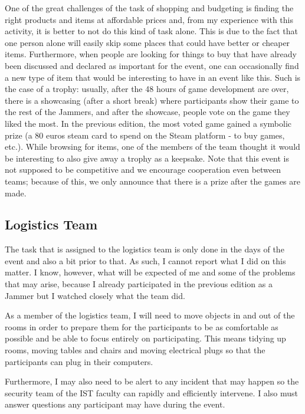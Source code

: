 \documentclass[a4paper,12pt,journal,twoside,compsoc]{PPIEEEtran}
\begin{document}
One of the great challenges of the task of shopping and budgeting is finding the right products and items at affordable prices and, from my experience with this activity, it is better to not do this kind of task alone. This is due to the fact that one person alone will easily skip some places that could have better or cheaper items. Furthermore, when people are looking for things to buy that have already been discussed and declared as important for the event, one can occasionally find a new type of item that would be interesting to have in an event like this. Such is the case of a trophy: usually, after the 48 hours of game development are over, there is a showcasing (after a short break) where participants show their game to the rest of the Jammers, and after the showcase, people vote on the game they liked the most. In the previous edition, the most voted game gained a symbolic prize (a 80 euros steam card to spend on the Steam platform - to buy games, etc.). While browsing for items, one of the members of the team thought it would be interesting to also give away a trophy as a keepsake. Note that this event is not supposed to be competitive and we encourage cooperation even between teams; because of this, we only announce that there is a prize after the games are made.

\subsection{Logistics Team}

The task that is assigned to the logistics team is only done in the days of the event and also a bit prior to that. As such, I cannot report what I did on this matter. I know, however, what will be expected of me and some of the problems that may arise, because I already participated in the previous edition as a Jammer but I watched closely what the team did. 

As a member of the logistics team, I will need to move objects in and out of the rooms in order to prepare them for the participants to be as comfortable as possible and be able to focus entirely on participating. This means tidying up rooms, moving tables and chairs and moving electrical plugs so that the participants can plug in their computers.

Furthermore, I may also need to be alert to any incident that may happen so the security team of the IST faculty can rapidly and efficiently intervene. I also must answer questions any participant may have during the event.
\end{document}
